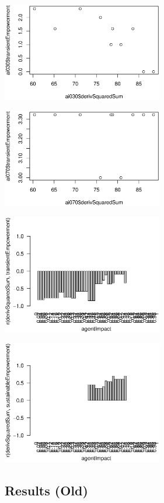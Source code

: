 \documentclass[conference]{IEEEtran}
\begin{document}
\centerline{\includegraphics[width=7cm]{n08_chain_large_corr_dss_emp_ai030.eps}}

\centerline{\includegraphics[width=7cm]{n08_chain_large_corr_dss_emp_ai070.eps}}

\centerline{\includegraphics[width=7cm]{n08_chain_large_corr_dss_emp.eps}}

\centerline{\includegraphics[width=7cm]{n08_chain_large_corr_dss_empsust.eps}}


\cleardoublepage


\subsection{Results (Old)}
\end{document}
